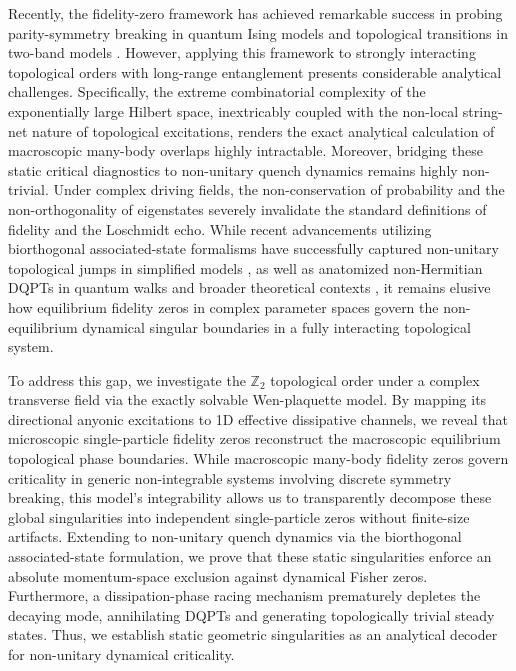 \documentclass[aps,prb,floatfix,superscriptaddress,reprint]{revtex4-2}
\begin{document}
Recently, the fidelity-zero framework has achieved remarkable success in probing parity-symmetry breaking in quantum Ising models \cite{Sun2026_1, Gu2026} and topological transitions in two-band models \cite{Chen2026_1}. However, applying this framework to strongly interacting topological orders with long-range entanglement presents considerable analytical challenges. Specifically, the extreme combinatorial complexity of the exponentially large Hilbert space, inextricably coupled with the non-local string-net nature of topological excitations, renders the exact analytical calculation of macroscopic many-body overlaps highly intractable. Moreover, bridging these static critical diagnostics to non-unitary quench dynamics remains highly non-trivial. Under complex driving fields, the non-conservation of probability and the non-orthogonality of eigenstates severely invalidate the standard definitions of fidelity and the Loschmidt echo. While recent advancements utilizing biorthogonal associated-state formalisms have successfully captured non-unitary topological jumps in simplified models \cite{Hu2024_1, Sun2021_2}, as well as anatomized non-Hermitian DQPTs in quantum walks and broader theoretical contexts \cite{ZhangXueP2025,FuGXL2025}, it remains elusive how equilibrium fidelity zeros in complex parameter spaces govern the non-equilibrium dynamical singular boundaries in a fully interacting topological system.

To address this gap, we investigate the $\mathbb{Z}_2$ topological order under a complex transverse field via the exactly solvable Wen-plaquette model\cite{Yu2008a, Zhang2011,Kou2009, Wu2012,Dusue2011, Schulz2012, Tupitsyn2010, Yu2013b}. By mapping its directional anyonic excitations to 1D effective dissipative channels, we reveal that microscopic single-particle fidelity zeros reconstruct the macroscopic equilibrium topological phase boundaries. While macroscopic many-body fidelity zeros govern criticality in generic non-integrable systems involving discrete symmetry breaking, this model's integrability allows us to transparently decompose these global singularities into independent single-particle zeros without finite-size artifacts. Extending to non-unitary quench dynamics via the biorthogonal associated-state formulation, we prove that these static singularities enforce an absolute momentum-space exclusion against dynamical Fisher zeros. Furthermore, a dissipation-phase racing mechanism prematurely depletes the decaying mode, annihilating DQPTs and generating topologically trivial steady states. Thus, we establish static geometric singularities as an analytical decoder for non-unitary dynamical criticality.
\end{document}
